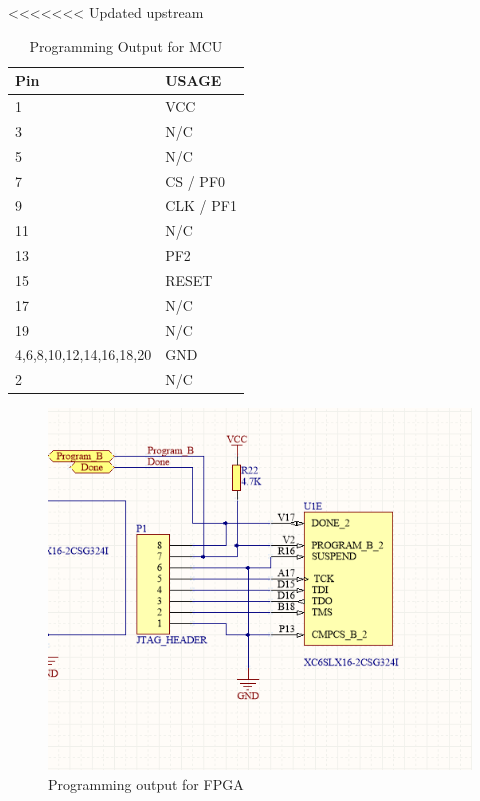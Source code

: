 <<<<<<< Updated upstream
\begin{table}[]
    \centering
    \begin{tabular}{ll}
        Pin                     & USAGE     \\
        \hline
        1                       & VCC       \\
        3                       & N/C       \\
        5                       & N/C       \\
        7                       & CS / PF0  \\
        9                       & CLK / PF1 \\
        11                      & N/C       \\
        13                      & PF2       \\
        15                      & RESET     \\
        17                      & N/C       \\
        19                      & N/C       \\
        4,6,8,10,12,14,16,18,20 & GND       \\
        2                       & N/C
    \end{tabular}
    \caption{Programming Output for MCU}
    \label{tab:EfmProgrammer}
\end{table}


\begin{figure}
    \includegraphics[width=\linewidth]{img/FPGA_Programmer}
    \caption{Programming output for FPGA}
    \label{fig:FpgaProgrammer}
\end{figure}

